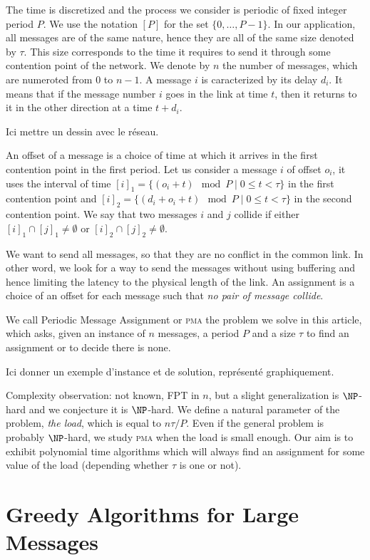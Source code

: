 \documentclass[10pt, conference, letterpaper]{IEEEtran}
\newcommand\pma{\textsc{pma}\xspace}
\begin{document}
The time is discretized and the process we consider is periodic of fixed integer period $P$. We use the notation $[P]$ for the set $\{0,\dots,P-1\}$. In our application, all messages are of the same nature, hence they are all of the same size denoted by $\tau$. This size corresponds to the time it requires to send it through some contention point of the network.
We denote by $n$ the number of messages, which are numeroted from $0$ to $n-1$. A message $i$ is caracterized by its delay $d_i$. It means that if the message number $i$ goes in the link at time $t$, then it returns to it in the other direction at a time $t + d_i$. 

Ici mettre un dessin avec le réseau.

An offset of a message is a choice of time at which it arrives
in the first contention point in the first period. Let us consider a message $i$
of offset $o_i$, it uses the interval of time $[i]_1 = \{ (o_i + t) \mod P \mid 0 \leq t < \tau \}$ in the first contention point and $[i]_2 = \{ (d_i + o_i + t) \mod P \mid 0 \leq t < \tau \}$ in the second contention point. We say that two messages $i$ and $j$ collide if either $[i]_1 \cap [j]_1 \neq \emptyset $ or $[i]_2 \cap [j]_2 \neq \emptyset $.

We want to send all messages, so that they are no conflict in the common link.
In other word, we look for a way to send the messages without using buffering and 
hence limiting the latency to the physical length of the link. An assignment is a
choice of an offset for each message such that \emph{no pair of message collide}.

We call Periodic Message Assignment or \pma the problem we solve in this article,
which asks, given an instance of $n$ messages, a period $P$ and a size $\tau$ to find 
an assignment or to decide there is none.

Ici donner un exemple d'instance et de solution, représenté graphiquement.

Complexity observation: not known, FPT in $n$, but a slight generalization is $\NP$-hard and
we conjecture it is $\NP$-hard.
We define a natural parameter of the  problem, \emph{the load}, which is equal
to $n \tau /P$. Even if the general problem is probably $\NP$-hard, we study \pma
when the load is small enough. Our aim is to exhibit polynomial time algorithms which will always find an assignment for some value of the load (depending whether $\tau$ is one or not).

\section{Greedy Algorithms for Large Messages}
\end{document}
